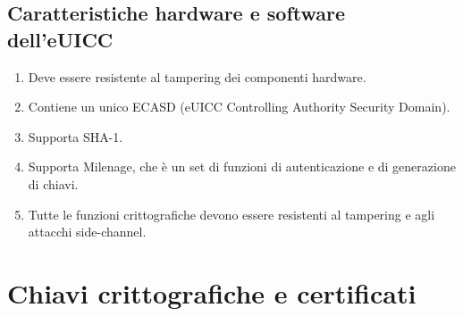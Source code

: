 \documentclass[10pt, oneside]{book}
\begin{document}
\subsection{Caratteristiche hardware e software dell'eUICC}
\begin{enumerate}[itemsep=0pt]
\item Deve essere resistente al tampering dei componenti hardware.
\item Contiene un unico ECASD (eUICC Controlling Authority Security Domain).
\item Supporta SHA-1.
\item Supporta Milenage, che è un set di funzioni di autenticazione e di generazione di chiavi.
\item Tutte le funzioni crittografiche devono essere resistenti al tampering e agli attacchi side-channel.
\end{enumerate}

\section{Chiavi crittografiche e certificati}
\end{document}
